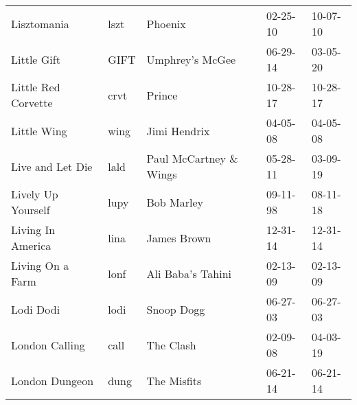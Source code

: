\begin{longtable}{p{}p{}p{}p{}p{}}
                                                             Lisztomania &          lszt &                                                  Phoenix &              02-25-10 &             10-07-10 \\
                                                             Little Gift &          GIFT &                                          Umphrey's McGee &              06-29-14 &             03-05-20 \\
                                                     Little Red Corvette &          crvt &                                                   Prince &              10-28-17 &             10-28-17 \\
                                                             Little Wing &          wing &                                             Jimi Hendrix &              04-05-08 &             04-05-08 \\
                                                        Live and Let Die &          lald &                                  Paul McCartney \& Wings &              05-28-11 &             03-09-19 \\
                                                      Lively Up Yourself &          lupy &                                               Bob Marley &              09-11-98 &             08-11-18 \\
                                                       Living In America &          lina &                                              James Brown &              12-31-14 &             12-31-14 \\
                                                        Living On a Farm &          lonf &                                        Ali Baba's Tahini &              02-13-09 &             02-13-09 \\
                                                               Lodi Dodi &          lodi &                                               Snoop Dogg &              06-27-03 &             06-27-03 \\
                                                          London Calling &          call &                                                The Clash &              02-09-08 &             04-03-19 \\
                                                          London Dungeon &          dung &                                              The Misfits &              06-21-14 &             06-21-14 \\

\end{longtable}
